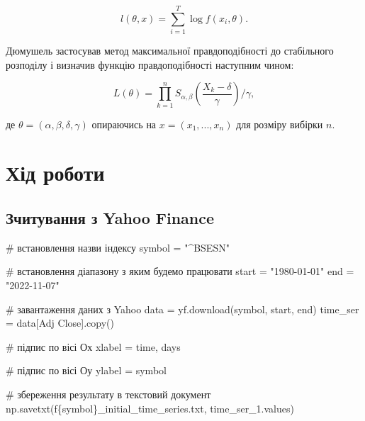 \documentclass[
  letterpaper,
]{report}
\newenvironment{Shaded}{\begin{snugshade}}{\end{snugshade}}
\newcommand{\CommentTok}[1]{\textcolor[rgb]{0.37,0.37,0.37}{#1}}
\newcommand{\NormalTok}[1]{\textcolor[rgb]{0.00,0.23,0.31}{#1}}
\newcommand{\OperatorTok}[1]{\textcolor[rgb]{0.37,0.37,0.37}{#1}}
\newcommand{\SpecialCharTok}[1]{\textcolor[rgb]{0.37,0.37,0.37}{#1}}
\newcommand{\SpecialStringTok}[1]{\textcolor[rgb]{0.13,0.47,0.30}{#1}}
\newcommand{\StringTok}[1]{\textcolor[rgb]{0.13,0.47,0.30}{#1}}
\begin{document}
\[ 
l(\theta, x) = \sum_{i=1}^{T}\log{f(x_{i}, \theta)}.
\]

Дюмушель застосував метод максимальної правдоподібності до стабільного
розподілу і визначив функцію правдоподібності наступним чином:

\[ 
L(\theta) = \prod_{k=1}^{n}S_{\alpha,\beta} \left( \frac{X_{k} - \delta}{\gamma} \right) \Big/ \gamma, 
\]

де \(\theta = (\alpha, \beta, \delta, \gamma)\) опираючись на
\(x = (x_1, ... , x_n)\) для розміру вибірки \(n\).

\hypertarget{ux445ux456ux434-ux440ux43eux431ux43eux442ux438-7}{%
\section{Хід
роботи}\label{ux445ux456ux434-ux440ux43eux431ux43eux442ux438-7}}

\hypertarget{ux437ux447ux438ux442ux443ux432ux430ux43dux43dux44f-ux437-yahoo-finance}{%
\subsection{Зчитування з Yahoo
Finance}\label{ux437ux447ux438ux442ux443ux432ux430ux43dux43dux44f-ux437-yahoo-finance}}

\begin{Shaded}
\begin{Highlighting}[]
\CommentTok{\# встановлення назви індексу}
\NormalTok{symbol }\OperatorTok{=} \StringTok{"\^{}BSESN"} 

\CommentTok{\# встановлення діапазону з яким будемо працювати}
\NormalTok{start }\OperatorTok{=} \StringTok{"1980{-}01{-}01"}
\NormalTok{end }\OperatorTok{=} \StringTok{"2022{-}11{-}07"}

\CommentTok{\# завантаження даних з Yahoo}
\NormalTok{data }\OperatorTok{=}\NormalTok{ yf.download(symbol, start, end)}
\NormalTok{time\_ser }\OperatorTok{=}\NormalTok{ data[}\StringTok{\textquotesingle{}Adj Close\textquotesingle{}}\NormalTok{].copy()}

\CommentTok{\# підпис по вісі Ох }
\NormalTok{xlabel }\OperatorTok{=} \StringTok{\textquotesingle{}time, days\textquotesingle{}}

\CommentTok{\# підпис по вісі Оу}
\NormalTok{ylabel }\OperatorTok{=}\NormalTok{ symbol                       }

\CommentTok{\# збереження результату в текстовий документ }
\NormalTok{np.savetxt(}\SpecialStringTok{f\textquotesingle{}}\SpecialCharTok{\{}\NormalTok{symbol}\SpecialCharTok{\}}\SpecialStringTok{\_initial\_time\_series.txt\textquotesingle{}}\NormalTok{, time\_ser\_1.values)}
\end{Highlighting}
\end{Shaded}
\end{document}
